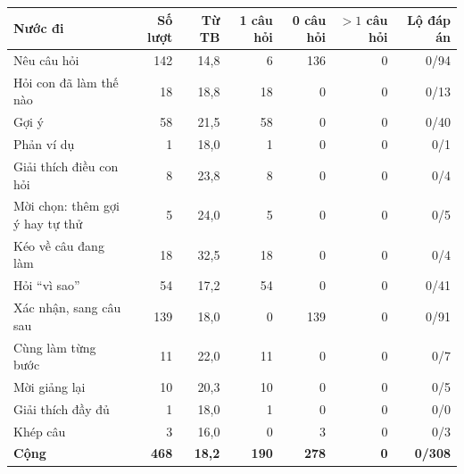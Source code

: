 \small
\begin{tabular}{@{}lrrrrrr@{}}
\toprule
Nước đi & Số lượt & Từ TB & 1 câu hỏi & 0 câu hỏi & $>1$ câu hỏi & Lộ đáp án \\
\midrule
Nêu câu hỏi & 142 & 14,8 & 6 & 136 & 0 & 0/94 \\
Hỏi con đã làm thế nào & 18 & 18,8 & 18 & 0 & 0 & 0/13 \\
Gợi ý & 58 & 21,5 & 58 & 0 & 0 & 0/40 \\
Phản ví dụ & 1 & 18,0 & 1 & 0 & 0 & 0/1 \\
Giải thích điều con hỏi & 8 & 23,8 & 8 & 0 & 0 & 0/4 \\
Mời chọn: thêm gợi ý hay tự thử & 5 & 24,0 & 5 & 0 & 0 & 0/5 \\
Kéo về câu đang làm & 18 & 32,5 & 18 & 0 & 0 & 0/4 \\
Hỏi ``vì sao'' & 54 & 17,2 & 54 & 0 & 0 & 0/41 \\
Xác nhận, sang câu sau & 139 & 18,0 & 0 & 139 & 0 & 0/91 \\
Cùng làm từng bước & 11 & 22,0 & 11 & 0 & 0 & 0/7 \\
Mời giảng lại & 10 & 20,3 & 10 & 0 & 0 & 0/5 \\
Giải thích đầy đủ & 1 & 18,0 & 1 & 0 & 0 & 0/0 \\
Khép câu & 3 & 16,0 & 0 & 3 & 0 & 0/3 \\
\midrule
\textbf{Cộng} & \textbf{468} & \textbf{18,2} & \textbf{190} & \textbf{278} & \textbf{0} & \textbf{0/308} \\
\bottomrule
\end{tabular}
